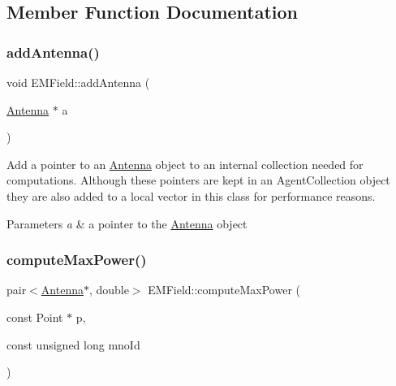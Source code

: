 \subsection{Member Function Documentation}
\mbox{\label{class_e_m_field_ac531ecbce4c81aa5da19fe3c734a585c}} 
\subsubsection{\texorpdfstring{addAntenna()}{addAntenna()}}
{\footnotesize\ttfamily void E\+M\+Field\+::add\+Antenna (\begin{DoxyParamCaption}\item[{\mbox{\hyperlink{class_antenna}{Antenna}} $\ast$}]{a }\end{DoxyParamCaption})}

Add a pointer to an \mbox{\hyperlink{class_antenna}{Antenna}} object to an internal collection needed for computations. Although these pointers are kept in an Agent\+Collection object they are also added to a local vector in this class for performance reasons. 
\begin{DoxyParams}{Parameters}
{\em a} & a pointer to the \mbox{\hyperlink{class_antenna}{Antenna}} object \\
\hline
\end{DoxyParams}
\mbox{\label{class_e_m_field_a01cfb9fea3dadfcfe5d6f00551193acd}} 
\subsubsection{\texorpdfstring{computeMaxPower()}{computeMaxPower()}}
{\footnotesize\ttfamily pair$<$\mbox{\hyperlink{class_antenna}{Antenna}}$\ast$, double$>$ E\+M\+Field\+::compute\+Max\+Power (\begin{DoxyParamCaption}\item[{const Point $\ast$}]{p,  }\item[{const unsigned long}]{mno\+Id }\end{DoxyParamCaption})}

